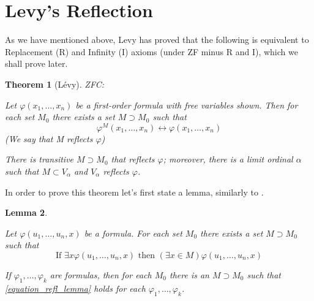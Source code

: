 \documentclass[12pt,a4paper]{article}
\newtheorem{theorem}{Theorem}[section]
\newtheorem{lemma}[theorem]{Lemma}
\renewcommand{\iff}{\leftrightarrow}
\newcommand{\bce}{\begin{compactenum}}
\newcommand{\ece}{\end{compactenum}}
\begin{document}

% 


\newpage
\section{Levy's Reflection}\label{sec:fixed}


As we have mentioned above, Levy has proved that the following is equivalent to Replacement ({\sf R}) and Infinity ({\sf I}) axioms (under {\sf ZF} minus R and I), which we shall prove later. \cite{Levy60a}

\medskip

\begin{theorem}[L{\'e}vy] \label{th:refl} ZFC: 
\bce[(i)]
\item Let $\varphi(x_1, \ldots, x_n)$ be a first-order formula with free variables shown. Then for each set $M_0$ there exists a set $M \supset M_0$ such that
\begin{equation}
\varphi^M (x_1,\ldots,x_n) \iff \varphi(x_1,\ldots,x_n)
\end{equation}
(We say that M reflects $\varphi$)
\item There is transitive $M \supset M_0$ that reflects $\varphi$; moreover, there is a limit ordinal $\alpha$ such that $M \subset V_\alpha$ and $V_\alpha$ reflects $\varphi$.
\ece
\end{theorem}

In order to prove this theorem let's first state a lemma, similarly to \cite{JechBook}.
\begin{lemma}
\bce[(i)]
\item Let $\varphi(u_1,\ldots,u_n,x)$ be a formula. For each set $M_0$ there exists a set $M \supset M_0$ such that
\begin{equation}\label{equation_refl_lemma}
\mbox{If }\exists x \varphi(u_1,\ldots,u_n,x) \mbox{ then } (\exists x \in M)\varphi (u_1,\ldots,u_n,x)
\end{equation}
\item If $\varphi_1,\ldots,\varphi_k$ are formulas, then for each $M_0$ there is an $M \supset M_0$ such that \ref{equation_refl_lemma} holds for each $\varphi_1,\ldots,\varphi_k$.
\ece
\end{lemma}
\end{document}
